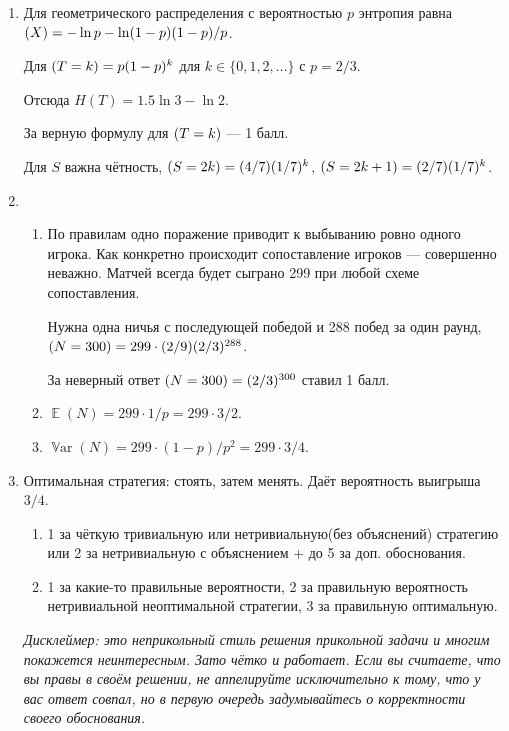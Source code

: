 \documentclass[12pt]{article}
\DeclareMathOperator{\Var}{\mathbb{V}ar}
\let\P\relax
\DeclareMathOperator{\P}{\mathbb{P}}
\let\H\relax
\DeclareMathOperator{\H}{\mathbb{H}}
\DeclareMathOperator{\E}{\mathbb{E}}
\begin{document}
\begin{enumerate}
\begin{enumerate}
\end{enumerate}
\item Для геометрического распределения с вероятностью $p$ 
    энтропия равна $\H(X) = -\ln p - \ln (1 - p) (1 - p) / p$.

    Для $\P(T = k) = p (1 - p)^k$ для $k \in \{0, 1, 2, \dots \}$ с $p = 2/3$.
    
    Отсюда $H(T) = 1.5 \ln 3 - \ln 2$. 
    
    За верную формулу для $\P(T = k)$ — 1 балл. 

    Для $S$ важна чётность, $\P(S = 2k) = (4/7)(1/7)^k$,
    $\P(S = 2k + 1) = (2/7) (1/7)^k$.

    \item 

    \begin{enumerate}
        \item По правилам одно поражение приводит к выбыванию ровно одного игрока.
        Как конкретно происходит сопоставление игроков — совершенно неважно. 
        Матчей всегда будет сыграно 299 при любой схеме сопоставления. 

        Нужна одна ничья с последующей победой и 288 побед за один раунд, $\P(N = 300) = 299 \cdot (2/9) (2/3)^{288}$.
        
        За неверный ответ $\P(N = 300) = (2/3)^{300}$ ставил 1 балл.
        \item $\E(N) = 299 \cdot 1/p = 299 \cdot 3 /2$.
        \item $\Var(N) = 299 \cdot (1-p)/p^2 = 299 \cdot 3/4$.
    \end{enumerate}

    \item Оптимальная стратегия: стоять, затем менять. Даёт вероятность выигрыша $3/4$. 
    \begin{enumerate}
    \item 1 за чёткую тривиальную или нетривиальную(без объяснений) стратегию или 2 за нетривиальную с объяснением + до 5 за доп. обоснования.
    \item 1 за какие-то правильные вероятности, 2 за правильную вероятность нетривиальной неоптимальной стратегии, 3 за правильную оптимальную. 
    \end{enumerate}

    \textit{Дисклеймер: это неприкольный стиль решения прикольной задачи и многим покажется неинтересным. 
    Зато чётко и работает. 
    Если вы считаете, что вы правы в своём решении, не аппелируйте исключительно к тому, что у вас ответ совпал, 
    но в первую очередь задумывайтесь о корректности своего обоснования.}
    

\end{enumerate}
\end{document}
